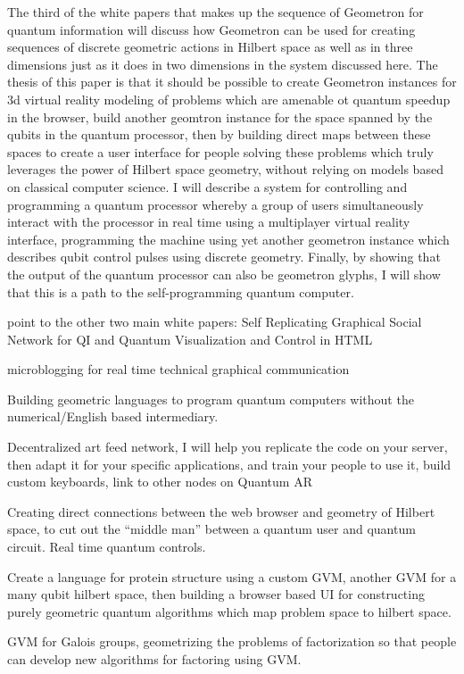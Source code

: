 \documentclass[11pt]{article}
\begin{document}
The third of the white papers that makes up the sequence of Geometron for quantum information will discuss how Geometron can be used for creating sequences of discrete geometric actions in Hilbert space as well as in three dimensions just as it does in two dimensions in the system discussed here.  The thesis of this paper is that it should be possible to create Geometron instances for 3d virtual reality modeling of problems which are amenable ot quantum speedup in the browser, build another geomtron instance for the space spanned by the qubits in the quantum processor, then by building direct maps between these spaces to create a user interface for people solving these problems which truly leverages the power of Hilbert space geometry, without relying on models based on classical computer science.   I will describe a system for controlling and programming a quantum processor whereby a group of users simultaneously interact with the processor in real time using a multiplayer virtual reality interface, programming the machine using yet another geometron instance which describes qubit control pulses using discrete geometry.  Finally, by showing that the output of the quantum processor can also be geometron glyphs, I will show that this is a path to the self-programming quantum computer.



point to the other two main white papers: 
    Self Replicating Graphical Social Network for QI and 
    Quantum Visualization and Control in HTML

    microblogging for real time technical graphical communication




    Building geometric languages to program quantum computers without the numerical/English based intermediary.




    Decentralized art feed network, I will help you replicate the code on your server, then adapt it for your specific applications, and train your people to use it, build custom keyboards, link to other nodes on Quantum AR





Creating direct connections between the web browser and geometry of Hilbert space, to cut out the ``middle man'' between a quantum user and quantum circuit.  Real time quantum controls.    


    Create a language for protein structure using a custom GVM, another GVM for a many qubit hilbert space, then building a browser based UI for constructing purely geometric quantum algorithms which map problem space to hilbert space.  


    GVM for Galois groups, geometrizing the problems of factorization so that people can develop new algorithms for factoring using GVM.
\end{document}
